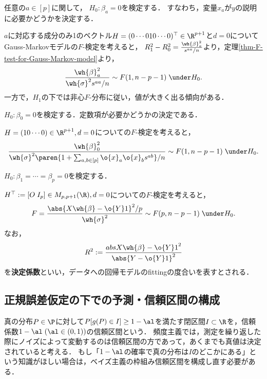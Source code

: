 \documentclass[uplatex,dvipdfmx]{jsreport}
\begin{document}
\begin{problem}[特定の独立変数の有意性検定]
    任意の$a\in[p]$に関して，
    $H_0:\beta_a=0$を検定する．
    すなわち，変量$x_a$が$y$の説明に必要かどうかを決定する．
\end{problem}

\begin{test}
    $a$に対応する成分のみ1のベクトル$H=(0\cdots010\cdots0)^\top\in\R^{p+1}$と$d=0$についてGauss-Markovモデルの$F$-検定を考えると，
    $R^2_1-R^2_0=\frac{\wh{\beta}^2_a}{s^{aa}/n}$より，定理\ref{thm-F-test-for-Gauss-Markov-model}より，
    \[\frac{\wh{\beta}_a^2}{\wh{\sigma}^2s^{aa}/n}\sim F(1,n-p-1)\;\under H_0.\]
    一方で，$H_1$の下では非心$F$-分布に従い，値が大きく出る傾向がある．
\end{test}

\begin{problem}[定数項の優位性検定]
    $H_0:\beta_0=0$を検定する．定数項が必要かどうかの決定である．
\end{problem}

\begin{test}
    $H=(10\cdots0)\in\R^{p+1},d=0$についての$F$-検定を考えると，
    \[\frac{\wh{\beta}^2_0}{\wh{\sigma}^2\paren{1+\sum_{a,b\in[p]}\o{x}_a\o{x}_bs^{ab}}/n}\sim F(1,n-p-1)\;\under H_0.\]
\end{test}

\begin{problem}[回帰モデル全体の優位性検定]
    $H_0:\beta_1=\cdots=\beta_p=0$を検定する．
\end{problem}
\begin{test}
    $H^\top:=[O\;I_p]\in M_{p,p+1}(\R),d=0$についての$F$-検定を考えると，
    \[F=\frac{\abs{X\wh{\beta}-\o{Y}1}^2/p}{\wh{\sigma}^2}\sim F(p,n-p-1)\;\under H_0.\]
    なお，
    \[R^2:=\frac{abs{X\wh{\beta}-\o{Y}1}^2}{\abs{Y-\o{Y}1}^2}\]
    を\textbf{決定係数}といい，データへの回帰モデルのfittingの度合いを表すとされる．
\end{test}

\subsection{正規誤差仮定の下での予測・信頼区間の構成}

\begin{tcolorbox}[colframe=ForestGreen, colback=ForestGreen!10!white,breakable,colbacktitle=ForestGreen!40!white,coltitle=black,fonttitle=\bfseries\sffamily,
title=]
    真の分布$P\in\P$に対して$P[g(P)\in I]\ge1-\al$を満たす閉区間$I\subset\R$を，信頼係数$1-\al\;(\al\in(0,1))$の信頼区間という．
    頻度主義では，測定を繰り返した際にノイズによって変動するのは信頼区間の方であって，あくまでも真値は決定されていると考える．
    もし「$1-\al$の確率で真の分布は$I$のどこかにある」という知識がほしい場合は，ベイズ主義の枠組み信頼区間を構成し直す必要がある．
\end{tcolorbox}
\end{document}
